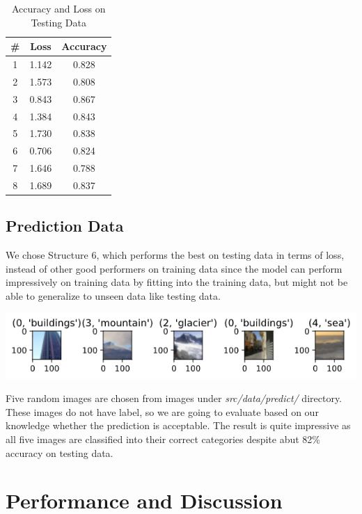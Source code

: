 \documentclass{article}
\begin{document}
\begin{table}[]
    \centering
    \begin{tabular}{|c|c|c|}
    \hline
    \#&Loss&Accuracy\\
    \hline
    1&1.142&0.828\\
    \hline
    2&1.573&0.808\\
    \hline
    3&0.843&0.867\\
    \hline
    4&1.384&0.843\\
    \hline
    5&1.730&0.838\\
    \hline
    6&0.706&0.824\\
    \hline
    7&1.646&0.788\\
    \hline
    8&1.689&0.837\\
    \hline
    \end{tabular}
    \caption{Accuracy and Loss on Testing Data}
    \label{t2:acc_loss_test_tab}
\end{table}

\subsection{Prediction Data}

We chose Structure 6, which performs the best on testing data in terms of loss, instead of other good performers on training data since the model can perform impressively on training data by fitting into the training data, but might not be able to generalize to unseen data like testing data.

\begin{center}
    \includegraphics[scale=0.68]{assets/s6.png}
\end{center}

Five random images are chosen from images under \textit{src/data/predict/} directory. These images do not have label, so we are going to evaluate based on our knowledge whether the prediction is acceptable. The result is quite impressive as all five images are classified into their correct categories despite abut 82\% accuracy on testing data.


\section{Performance and Discussion}
\end{document}
